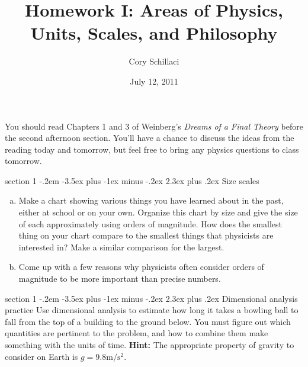 \documentclass[12pt]{article}
\makeatletter
\newenvironment{problem}{\@startsection
       {section}
       {1}
       {-.2em}
       {-3.5ex plus -1ex minus -.2ex}
       {2.3ex plus .2ex}
       {\pagebreak[3]%
       \large\bf\noindent{Question }
       }
       }
       {%
       }
\makeatother
\begin{document}
\title{\Large\textbf{Homework I: Areas of Physics, Units, Scales, and Philosophy}} 
\author{\normalsize Cory Schillaci}
\date{\small July 12, 2011} 	

\maketitle

\thispagestyle{empty}

You should read Chapters 1 and 3 of Weinberg's \emph{Dreams of a Final Theory} before the second afternoon section. You'll have a chance to discuss the ideas from the reading today and tomorrow, but feel free to bring any physics questions to class tomorrow.

\begin{problem}{Size scales}
\begin{enumerate}[a)]
\item Make a chart showing various things you have learned about in the past, either at school or on your own. Organize this chart by size and give the size of each approximately using orders of magnitude. How does the smallest thing on your chart compare to the smallest things that physicists are interested in? Make a similar comparison for the largest.
\item Come up with a few reasons why physicists often consider orders of magnitude to be more important than precise numbers.
\end{enumerate}
\end{problem}

\begin{problem}{Dimensional analysis practice}
Use dimensional analysis to estimate how long it takes a bowling ball to fall from the top of a building to the ground below. You must figure out which quantities are pertinent to the problem, and how to combine them make something with the units of time.
\textbf{Hint:} The appropriate property of gravity to consider on Earth is $g=9.8\text{m}/\text{s}^2$.
\end{problem}
\end{document}

